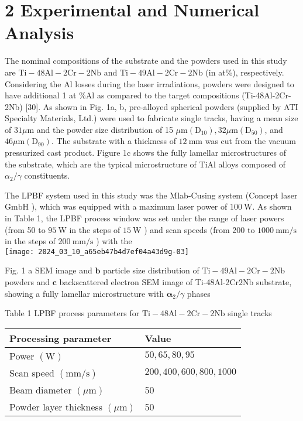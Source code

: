 \documentclass[10pt]{article}
\begin{document}
\section*{2 Experimental and Numerical Analysis}
The nominal compositions of the substrate and the powders used in this study are $\mathrm{Ti}-48 \mathrm{Al}-2 \mathrm{Cr}-2 \mathrm{Nb}$ and $\mathrm{Ti}-49 \mathrm{Al}-2 \mathrm{Cr}-2 \mathrm{Nb}$ (in at\%), respectively. Considering the $\mathrm{Al}$ losses during the laser irradiations, powders were designed to have additional 1 at $\% \mathrm{Al}$ as compared to the target compositions (Ti-48Al-2Cr-2Nb) [30]. As shown in Fig. 1a, b, pre-alloyed spherical powders (supplied by ATI Specialty Materials, Ltd.) were used to fabricate single tracks, having a mean size of $31 \mu \mathrm{m}$ and the powder size distribution of 15 $\mu \mathrm{m}\left(\mathrm{D}_{10}\right), 32 \mu \mathrm{m}\left(\mathrm{D}_{50}\right)$, and $46 \mu \mathrm{m}\left(\mathrm{D}_{90}\right)$. The substrate with a thickness of $12 \mathrm{~mm}$ was cut from the vacuum pressurized cast product. Figure 1c shows the fully lamellar microstructures of the substrate, which are the typical microstructure of TiAl alloys composed of $\alpha_{2} / \gamma$ constituents.

The LPBF system used in this study was the Mlab-Cusing system (Concept laser $\mathrm{GmbH}$ ), which was equipped with a maximum laser power of $100 \mathrm{~W}$. As shown in Table 1, the LPBF process window was set under the range of laser powers (from 50 to $95 \mathrm{~W}$ in the steps of $15 \mathrm{~W}$ ) and scan speeds (from 200 to $1000 \mathrm{~mm} / \mathrm{s}$ in the steps of $200 \mathrm{~mm} / \mathrm{s}$ ) with the\\
\texttt{[image: 2024\_03\_10\_a65eb47b4d7ef04a43d9g-03]}

Fig. 1 a SEM image and $\mathbf{b}$ particle size distribution of $\mathrm{Ti}-49 \mathrm{Al}-2 \mathrm{Cr}-2 \mathrm{Nb}$ powders and $\mathbf{c}$ backscattered electron SEM image of Ti-48Al-2Cr$2 \mathrm{Nb}$ substrate, showing a fully lamellar microstructure with $\boldsymbol{\alpha}_{2} / \gamma$ phases

Table 1 LPBF process parameters for $\mathrm{Ti}-48 \mathrm{Al}-2 \mathrm{Cr}-2 \mathrm{Nb}$ single tracks

\begin{center}
\begin{tabular}{ll}
\hline
Processing parameter & Value \\
\hline
Power $(\mathrm{W})$ & $50,65,80,95$ \\
Scan speed $(\mathrm{mm} / \mathrm{s})$ & $200,400,600,800,1000$ \\
Beam diameter $(\mu \mathrm{m})$ & 50 \\
Powder layer thickness $(\mu \mathrm{m})$ & 50 \\
\hline
\end{tabular}
\end{center}
\end{document}
